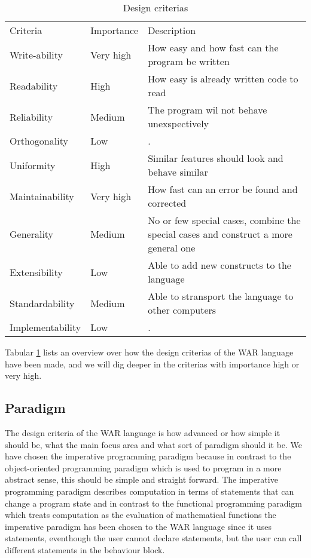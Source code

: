 \begin{table}[H]
	\begin{tabular}{l l p{7cm}}
	Criteria			&	Importance	&		Description	\\		
	Write-ability 		& 	Very high	&		How easy and how fast can the program be written\\
	Readability			& 	High		&		How easy is already written code to read\\
	Reliability			& 	Medium		&		The program wil not behave unexspectively\\
	Orthogonality		& 	Low			&		.\\
	Uniformity			& 	High		&		Similar features should look and behave similar\\
	Maintainability		& 	Very high	&		How fast can an error be found and corrected\\
	Generality			& 	Medium		&		No or few special cases, combine the special cases and construct a more general one\\
	Extensibility		& 	Low			&		Able to add new constructs to the language\\
	Standardability		& 	Medium		&		Able to stransport the language to other computers\\
	Implementability	& 	Low			&		.\\
	\end{tabular}
	\caption{Design criterias}
	\label{tab:criteria_tabular}
\end{table}


Tabular \ref{tab:criteria_tabular} lists an overview over how the design criterias of the WAR language have been made, and we will dig deeper in the criterias with importance high or very high.



\subsection{Paradigm}
The design criteria of the WAR language is how advanced or how simple it should be, what the main focus area and what sort of paradigm should it be. We have chosen the imperative programming paradigm because in contrast to the object-oriented programming paradigm which is used to program in a more abstract sense, this should be simple and straight forward. The imperative programming paradigm describes computation in terms of statements that can change a program state and in contrast to the functional programming paradigm which treats computation as the evaluation of mathematical functions the imperative paradigm has been chosen to the WAR language since it uses statements, eventhough the user cannot declare statements, but the user can call different statements in the behaviour block. 

